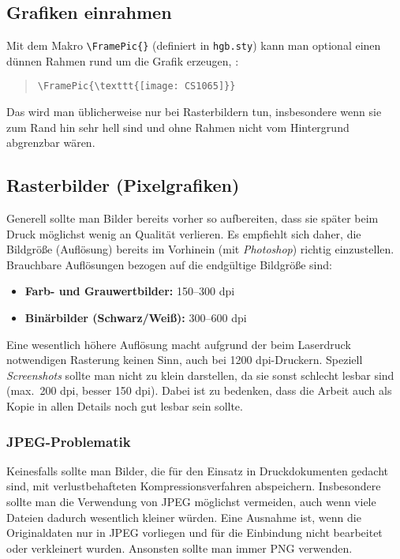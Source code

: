 \subsection{Grafiken einrahmen} 

Mit dem Makro \verb!\FramePic{}! (definiert in \texttt{hgb.sty}) kann man optional einen dünnen 
Rahmen rund um die Grafik erzeugen, \zB:
%
\begin{quote}\small
\verb!\FramePic{\texttt{[image: CS1065]}}!
\end{quote}
%
Das wird man üblicherweise nur bei Rasterbildern tun, insbesondere wenn sie zum Rand hin sehr hell sind
und ohne Rahmen nicht vom Hintergrund abgrenzbar wären.

\subsection{Rasterbilder (Pixelgrafiken)}

Generell sollte man Bilder bereits vorher so aufbereiten,
dass sie später beim Druck möglichst wenig an Qualität verlieren.
Es empfiehlt sich daher, die Bildgröße (Auflösung) bereits im Vorhinein
(\zB mit \emph{Photoshop})
richtig einzustellen.
Brauchbare Auflösungen bezogen auf die endgültige Bildgröße sind:
%
\begin{itemize}
  \item \textbf{Farb- und Grauwertbilder:} 150--300 dpi
  \item \textbf{Binärbilder (Schwarz/Weiß):} 300--600 dpi
\end{itemize}
%
Eine wesentlich höhere Auflösung macht aufgrund der beim Laserdruck notwendigen
Rasterung keinen Sinn, auch bei 1200 dpi-Druckern.
Speziell \emph{Screen\-shots} sollte man nicht zu klein darstellen,
da sie sonst schlecht lesbar sind (max.\ 200 dpi, besser 150 dpi).
Dabei ist zu bedenken, dass die Arbeit auch als Kopie in allen
Details noch gut lesbar sein sollte.

\subsubsection{JPEG-Problematik}

Keinesfalls sollte man Bilder, die für den Einsatz in
Druckdokumenten gedacht sind, mit verlustbehafteten
Kompressionsverfahren abspeichern. Insbesondere sollte man die Verwendung
von JPEG möglichst vermeiden, auch wenn viele Dateien dadurch
wesentlich kleiner würden. 
Eine Ausnahme ist, wenn die Originaldaten nur in JPEG vorliegen und für die 
Einbindung nicht bearbeitet oder verkleinert wurden. Ansonsten sollte man immer
PNG verwenden.

